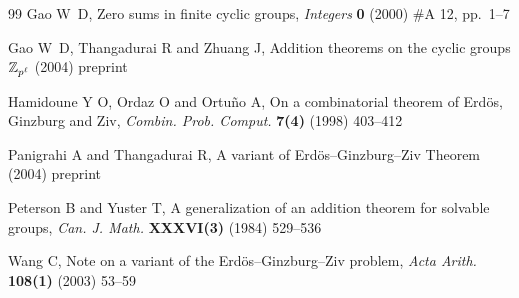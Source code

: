 \documentclass[fleqn]{mat01}
\begin{document}
\begin{thebibliography}{99}
 Gao W~D, Zero sums in finite cyclic groups, {\it
Integers} {\bf 0} (2000) \#A 12, pp.~1--7

 Gao W~D, Thangadurai R and Zhuang J, Addition
theorems on the cyclic groups ${\Bbb Z}_{p^\ell}$ (2004) preprint

 Hamidoune Y O, Ordaz O and Ortu\~no A, On a combinatorial
theorem of Erd\"{o}s, Ginzburg and Ziv, {\it Combin. Prob. Comput.} {\bf
7(4)} (1998) 403--412

 Panigrahi A and Thangadurai R, A variant of
Erd\"{o}s--Ginzburg--Ziv Theorem (2004) preprint

 Peterson B and Yuster T, {A generalization of an addition
theorem for solvable groups}, {\it Can. J. Math.} {\bf XXXVI(3)} (1984)
529--536

 Wang C, Note on a variant of the Erd\"{o}s--Ginzburg--Ziv
problem, {\it Acta Arith.} {\bf 108(1)} (2003) 53--59
\end{thebibliography}
\end{document}
